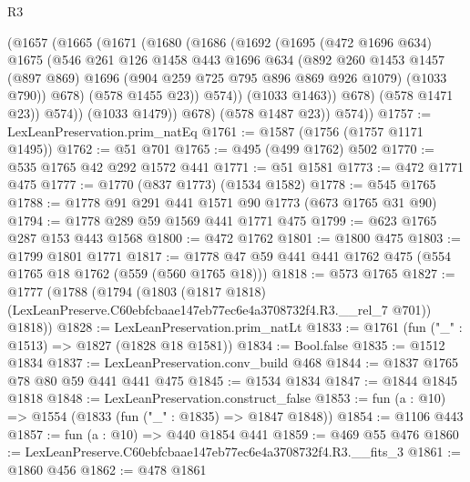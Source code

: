 \begin{lexlean}{R3}
\begin{coremodule}
                (@1657
                  (@1665
                    (@1671
                      (@1680
                        (@1686
                          (@1692
                            (@1695
                              (@472 @1696 @634)
                              @1675
                              (@546
                                @261
                                @126
                                @1458
                                @443
                                @1696
                                @634
                                (@892
                                  @260
                                  @1453
                                  @1457
                                  (@897 @869)
                                  @1696
                                  (@904 @259 @725 @795 @896 @869 @926 @1079)
                                  (@1033 @790))
                                @678)
                              (@578 @1455 @23))
                            @574))
                        (@1033 @1463))
                      @678)
                    (@578 @1471 @23))
                  @574))
              (@1033 @1479))
            @678)
          (@578 @1487 @23))
        @574))
@1757 := LexLeanPreservation.prim_natEq
@1761 := @1587 (@1756 (@1757 @1171 @1495))
@1762 := @51 @701
@1765 := @495 (@499 @1762) @502
@1770 := @535 @1765 @42 @292 @1572 @441
@1771 := @51 @1581
@1773 := @472 @1771 @475
@1777 := @1770 (@837 @1773) (@1534 @1582)
@1778 := @545 @1765
@1788 := @1778 @91 @291 @441 @1571 @90 @1773 (@673 @1765 @31 @90)
@1794 := @1778 @289 @59 @1569 @441 @1771 @475
@1799 := @623 @1765 @287 @153 @443 @1568
@1800 := @472 @1762
@1801 := @1800 @475
@1803 := @1799 @1801 @1771
@1817 := @1778 @47 @59 @441 @441 @1762 @475 (@554 @1765 @18 @1762 (@559 (@560 @1765 @18)))
@1818 := @573 @1765
@1827 := @1777
    (@1788
      (@1794
        (@1803 (@1817 @1818) (LexLeanPreserve.C60ebfcbaae147eb77ec6e4a3708732f4.R3.__rel_7 @701))
        @1818))
@1828 := LexLeanPreservation.prim_natLt
@1833 := @1761 (fun ("_" : @1513) => @1827 (@1828 @18 @1581))
@1834 := Bool.false
@1835 := @1512 @1834
@1837 := LexLeanPreservation.conv_build @468
@1844 := @1837 @1765 @78 @80 @59 @441 @441 @475
@1845 := @1534 @1834
@1847 := @1844 @1845 @1818
@1848 := LexLeanPreservation.construct_false
@1853 := fun (a : @10) => @1554 (@1833 (fun ("_" : @1835) => @1847 @1848))
@1854 := @1106 @443
@1857 := fun (a : @10) => @440 @1854 @441
@1859 := @469 @55 @476
@1860 := LexLeanPreserve.C60ebfcbaae147eb77ec6e4a3708732f4.R3.__fits_3
@1861 := @1860 @456
@1862 := @478 @1861

\end{coremodule}
\end{lexlean}
